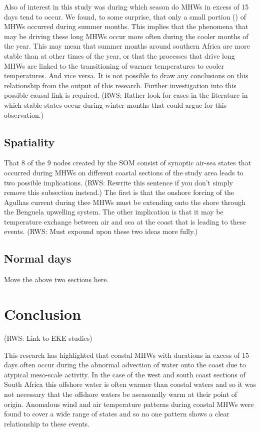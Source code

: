 \documentclass[a4paper,10pt,review]{elsarticle}
\begin{document}
Also of interest in this study was during which season do MHWs in excess of 15 days tend to occur. We found, to some surprise, that only a small portion () of MHWs occurred during summer months. This implies that the phenomena that may be driving these long MHWs occur more often during the cooler months of the year. This may mean that summer months around southern Africa are more stable than at other times of the year, or that the processes that drive long MHWs are linked to the transitioning of warmer temperatures to cooler temperatures. And vice versa. It is not possible to draw any conclusions on this relationship from the output of this research. Further investigation into this possible causal link is required. (RWS: Rather look for cases in the literature in which stable states occur during winter months that could argue for this observation.)

\subsection{Spatiality}
That 8 of the 9 nodes created by the SOM consist of synoptic air-sea states that occurred during MHWs on different coastal sections of the study area leads to two possible implications. (RWS: Rewrite this sentence if you don't simply remove this subsection instead.) The first is that the onshore forcing of the Agulhas current during thee MHWs must be extending onto the shore through the Benguela upwelling system. The other implication is that it may be temperature exchange between air and sea at the coast that is leading to these events. (RWS: Must expound upon these two ideas more fully.)

\subsection{Normal days}
Move the above two sections here.

\section{Conclusion}

(RWS: Link to EKE studies)

This research has highlighted that coastal MHWs with durations in excess of 15 days often occur during the abnormal advection of water onto the coast due to atypical meso-scale activity. In the case of the west and south coast sections of South Africa this offshore water is often warmer than coastal waters and so it was not necessary that the offshore waters be aseasonally warm at their point of origin. Anomalous wind and air temperature patterns during coastal MHWs were found to cover a wide range of states and so no one pattern shows a clear relationship to these events.
\end{document}
